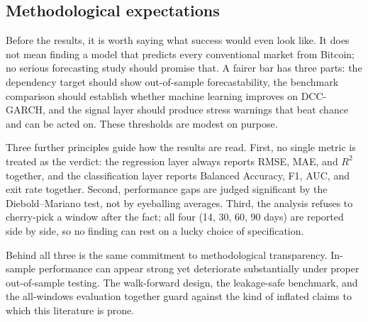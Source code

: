 \subsection{Methodological expectations}

Before the results, it is worth saying what success would even look like. It does not mean finding a model that predicts every conventional market from Bitcoin; no serious forecasting study should promise that. A fairer bar has three parts: the dependency target should show out-of-sample forecastability, the benchmark comparison should establish whether machine learning improves on DCC-GARCH, and the signal layer should produce stress warnings that beat chance and can be acted on. These thresholds are modest on purpose.

Three further principles guide how the results are read. First, no single metric is treated as the verdict: the regression layer always reports RMSE, MAE, and $R^2$ together, and the classification layer reports Balanced Accuracy, F1, AUC, and exit rate together. Second, performance gaps are judged significant by the Diebold--Mariano test, not by eyeballing averages. Third, the analysis refuses to cherry-pick a window after the fact; all four (14, 30, 60, 90 days) are reported side by side, so no finding can rest on a lucky choice of specification.

Behind all three is the same commitment to methodological transparency. In-sample performance can appear strong yet deteriorate substantially under proper out-of-sample testing. The walk-forward design, the leakage-safe benchmark, and the all-windows evaluation together guard against the kind of inflated claims to which this literature is prone.
